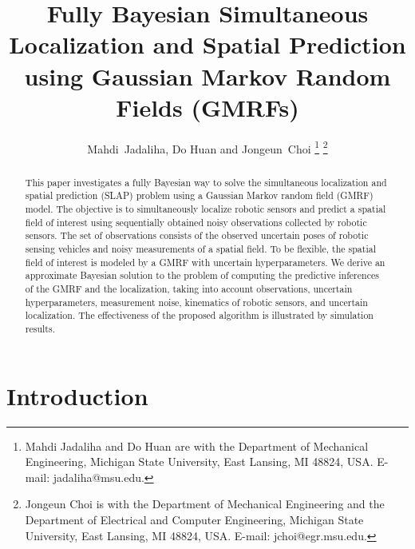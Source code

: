 \documentclass[letterpaper, 10 pt, conference]{ieeeconf}
\begin{document}
\title{\LARGE \bf Fully Bayesian Simultaneous Localization and Spatial Prediction using Gaussian Markov Random Fields (GMRFs)}

\author{Mahdi~Jadaliha, Do Huan and Jongeun~Choi
 \thanks{Mahdi Jadaliha and Do Huan are with the Department of Mechanical Engineering,
 Michigan State University, East Lansing, MI 48824, USA. E-mail:
 jadaliha@msu.edu.}
 \thanks{Jongeun Choi is with the Department of Mechanical
 Engineering and the Department of Electrical and Computer Engineering, Michigan
 State University, East Lansing, MI 48824, USA. E-mail:
 jchoi@egr.msu.edu.}}
\maketitle
\thispagestyle{empty}
\pagestyle{empty}

\begin{abstract}
This paper investigates a fully Bayesian way to solve the simultaneous localization and spatial prediction (SLAP) problem using a Gaussian Markov random field (GMRF) model. The objective is to simultaneously localize robotic sensors and predict a spatial field of interest using sequentially obtained noisy observations collected by robotic sensors. The set of observations consists of the observed uncertain poses of robotic sensing vehicles and noisy measurements of a spatial field. To be flexible, the spatial field of interest is modeled by a GMRF with uncertain hyperparameters. We derive an approximate Bayesian solution to the problem of computing the predictive inferences of the GMRF and the localization, taking into account observations, uncertain hyperparameters, measurement noise, kinematics of robotic sensors, and uncertain localization. 
The effectiveness of the proposed algorithm is illustrated by simulation results.
\end{abstract}

%
\section{Introduction}
\end{document}
